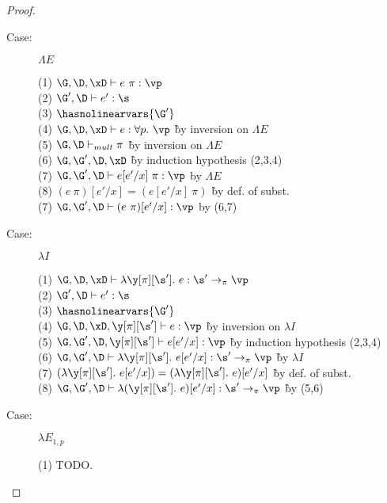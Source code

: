 \begin{proof}
\begin{description}
\item[Case:] $\Lambda E$
\begin{tabbing}
    (1) $\G, \D, \xD \vdash e~\pi : \vp$\\
    (2) $\G', \D \vdash e' : \s$\\
    (3) $\hasnolinearvars{\G'}$\\
    (4) $\G, \D, \xD \vdash e : \forall p.~\vp$ \` by inversion on $\Lambda E$\\
    (5) $\G, \D \vdash_{mult} \pi$ \` by inversion on $\Lambda E$\\
    (6) $\G, \G', \D, \xD$ \` by induction hypothesis (2,3,4)\\
    (7) $\G, \G', \D \vdash e[e'/x]~\pi : \vp$ by $\Lambda E$\\
    (8) $(e~\pi)[e'/x] = (e[e'/x]~\pi)$ \` by def. of subst.\\
    (7) $\G, \G', \D \vdash (e~\pi)[e'/x] : \vp$ by (6,7)\\
\end{tabbing}

\item[Case:] $\lambda I$
\begin{tabbing}
    (1) $\G, \D, \xD \vdash \lambda \y[\pi][\s'].~e : \s' \to_\pi \vp$\\
    (2) $\G', \D \vdash e' : \s$\\
    (3) $\hasnolinearvars{\G'}$\\
    (4) $\G, \D, \xD, \y[\pi][\s'] \vdash e : \vp$ \` by inversion on $\lambda I$\\
    (5) $\G, \G', \D, \y[\pi][\s'] \vdash e[e'/x] : \vp$ \` by induction hypothesis (2,3,4)\\
    (6) $\G, \G', \D \vdash \lambda \y[\pi][\s'].~e[e'/x] : \s' \to_\pi \vp$ \` by $\lambda I$\\
    (7) $(\lambda \y[\pi][\s'].~e[e'/x]) = (\lambda \y[\pi][\s'].~e)[e'/x]$ \` by def. of subst.\\
    (8) $\G, \G', \D \vdash \lambda (\y[\pi][\s'].~e)[e'/x] : \s' \to_\pi \vp$ \` by (5,6)\\
\end{tabbing}

\item[Case:] $\lambda E_{1,p}$
\begin{tabbing}
    (1) TODO.
\end{tabbing}


\end{description}
\end{proof}
